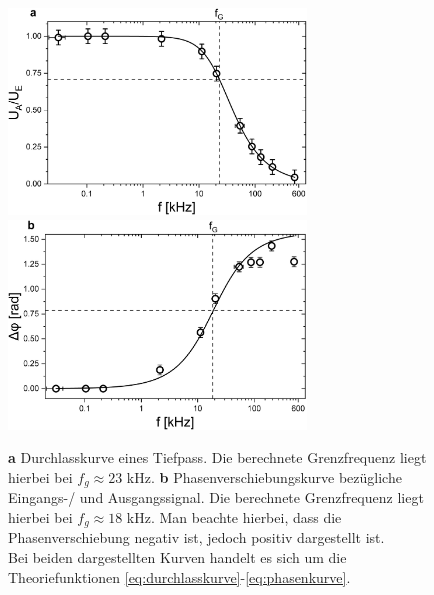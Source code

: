 \documentclass[a4paper,usenatbib]{aspdoc}
\begin{document}
            
                \begin{figure}
                    \centering
                    \includegraphics[width=79mm]{graphs/Durchlasskurv1.png}
                    \includegraphics[width=79mm]{graphs/Phasenkurv1.png}
                    \caption{
                        \textbf{a} Durchlasskurve eines Tiefpass. Die berechnete Grenzfrequenz liegt hierbei bei $f_g \approx 23$ kHz.
                        \textbf{b} Phasenverschiebungskurve bezügliche Eingangs-/ und Ausgangssignal. Die berechnete Grenzfrequenz liegt hierbei bei $f_g \approx 18$ kHz. Man beachte hierbei, dass die Phasenverschiebung negativ ist, jedoch positiv dargestellt ist. \\
                        Bei beiden dargestellten Kurven handelt es sich um die Theoriefunktionen \ref{eq:durchlasskurve}-\ref{eq:phasenkurve}.
                    }
                    \label{fig:kurve}
                \end{figure}
                
            
\end{document}
